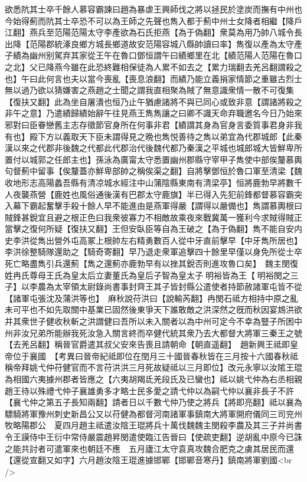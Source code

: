 欲悉阬其士卒千餘人慕容霸諫曰趙為暴虐王興師伐之將以拯民於塗炭而撫有中州也今始得薊而阬其士卒恐不可以為王師之先聲也雋入都于薊中州士女降者相繼【降戶江翻】燕兵至范陽范陽太守李產欲為石氏拒燕【為于偽翻】衆莫為用乃帥八城令長出降【范陽郡統涿良鄉方城長鄉道故安范陽容城八縣帥讀曰率】雋復以產為太守產子績為幽州别駕弃其家從王午在魯口鄧恒謂午曰績鄉里在北【績范陽人范陽在魯口之北】父已降燕今雖在此恐終難相保徒為人累不如去之【累力瑞翻去羌呂翻謂殺之也】午曰此何言也夫以當今喪亂【喪息浪翻】而績乃能立義捐家情節之重雖古烈士無以過乃欲以猜嫌害之燕趙之士聞之謂我直相聚為賊了無意識衆情一散不可復集【復扶又翻】此為坐自屠潰也恒乃止午猶慮諸將不與已同心或致非意【謂諸將殺之非午之意】乃遣績歸績始辭午往見燕王雋雋讓之曰卿不識天命弃職邀名今日乃始來邪對曰臣眷戀舊主志存徵節官身所在何事非君【績謂其身為官身言委質事君身非我有也】殿下方以義取天下臣未謂得見之晩也雋悦善待之雋以弟宜為代郡城郎【此秦漢以來之代郡非後魏之代都此代郡治代後魏代都乃秦漢之平城也城郎城大皆鮮卑所置付以城郭之任郎主也】孫泳為廣甯太守悉置幽州郡縣守宰甲子雋使中部俟釐慕輿句督薊中留事【俟釐蓋亦鮮卑部帥之稱俟渠之翻】自將擊鄧恒於魯口軍至清梁【魏收地形志高陽蠡吾縣有清凉城水經注中山蒲陰縣東南有清梁亭】恒將鹿勃早將數千人夜襲燕營【鹿姓也風俗通後漢有巴郡太守鹿旗】半已得入先犯前鋒都督慕容霸突入幕下霸起奮擊手殺十餘人早不能進由是燕軍得嚴【謂得以嚴備也】雋謂慕輿根曰賊鋒甚銳宜且避之根正色曰我衆彼寡力不相敵故乘夜來戰冀萬一獲利今求賊得賊正當擊之復何所疑【復扶又翻】王但安臥臣等自為王破之【為于偽翻】雋不能自安内史李洪從雋出營外屯高冢上根帥左右精勇數百人從中牙直前擊早【中牙雋所居也】李洪徐整騎隊還助之【騎奇寄翻】早乃退走衆軍追擊四十餘里早僅以身免所從士卒死亡略盡雋引兵還薊【雋之還薊亦鹿勃早有以挫其銳否則進攻魯口矣】　魏主閔復姓冉氏尊母王氏為皇太后立妻董氏為皇后子智為皇太子明裕皆為王【明裕閔之三子】以李農為太宰領太尉錄尚書事封齊王其子皆封縣公遣使者持節赦諸軍屯皆不從【諸軍屯張沈及蒲洪等也】　麻秋說苻洪曰【說輸芮翻】冉閔石祗方相持中原之亂未可平也不如先取關中基業已固然後東爭天下誰敢敵之洪深然之旣而秋因宴鴆洪欲并其衆世子健收秋斬之洪謂健曰吾所以未入關者以為中州可定今不幸為豎子所困中州非汝兄弟所能辦我死汝急入關言終而卒健代統其衆乃去大都督大將軍三秦王之號【去羌呂翻】稱晉官爵遣其叔父安來告喪且請朝命【朝直遥翻】　趙新興王祗即皇帝位于襄國　【考異曰晉帝紀祗即位在閏月三十國晉春秋皆在三月按十六國春秋祗稱帝拜姚弋仲苻健官而不言苻洪洪三月死故疑祗以三月即位】改元永寧以汝隂王琨為相國六夷據州郡者皆應之【六夷胡羯氐羌段氏及已蠻也】祗以姚弋仲為右丞相親趙王待以殊禮弋仲子襄雄勇多才略士民多愛之請弋仲以為嗣弋仲以襄非長子不許【襄弋仲之第五子長知兩翻】請者日以千數弋仲乃使之將兵【將即亮翻】祗以襄為驃騎將軍豫州刺史新昌公又以苻健為都督河南諸軍事鎮南大將軍開府儀同三司兖州牧略陽郡公　夏四月趙主祗遣汝陰王琨將兵十萬伐魏魏主閔殺李農及其三子并尚書令王謨侍中王衍中常侍嚴震趙昇閔遣使臨江告晉曰【使疏吏翻】逆胡亂中原今已誅之能共討者可遣軍來也朝廷不應　五月廬江太守袁真攻魏合肥克之虜其居民而還【還從宣翻又如字】六月趙汝陰王琨進據邯鄲【邯鄲音寒丹】鎮南將軍劉國<br />
